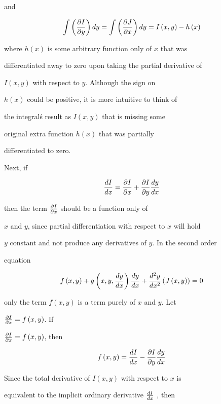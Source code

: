 and



$$\int \left({\partial I\over\partial y}\right)dy=\int \left({\partial J\over\partial x}\right)dy=I\left(x,y\right)-h\left(x\right)$$



where $h\left(x\right)$ is some arbitrary function only of $x$ that was

differentiated away to zero upon taking the partial derivative of

$I\left(x,y\right)$ with respect to $y$. Although the sign on

$h\left(x\right)$ could be positive, it is more intuitive to think of

the integral\'s result as $I\left(x,y\right)$ that is missing some

original extra function $h\left(x\right)$ that was partially

differentiated to zero.



Next, if



$${dI\over dx}={\partial I\over\partial x}+{\partial I\over\partial y}{dy \over dx}$$



then the term ${\partial I\over\partial x}$ should be a function only of

$x$ and $y$, since partial differentiation with respect to $x$ will hold

$y$ constant and not produce any derivatives of $y$. In the second order

equation



$$f\left(x,y\right)+g\left(x,y,{dy \over dx}\right){dy \over dx}+{d^2y \over dx^2}\left(J\left(x,y\right)\right)=0$$



only the term $f\left(x,y\right)$ is a term purely of $x$ and $y$. Let

${\partial I\over\partial x}=f\left(x,y\right)$. If

${\partial I\over\partial x}=f\left(x,y\right)$, then



$$f\left(x,y\right)={ dI\over dx}-{\partial I\over\partial y}{dy \over dx}$$



Since the total derivative of $I\left(x,y\right)$ with respect to $x$ is

equivalent to the implicit ordinary derivative ${dI \over dx}$ , then



